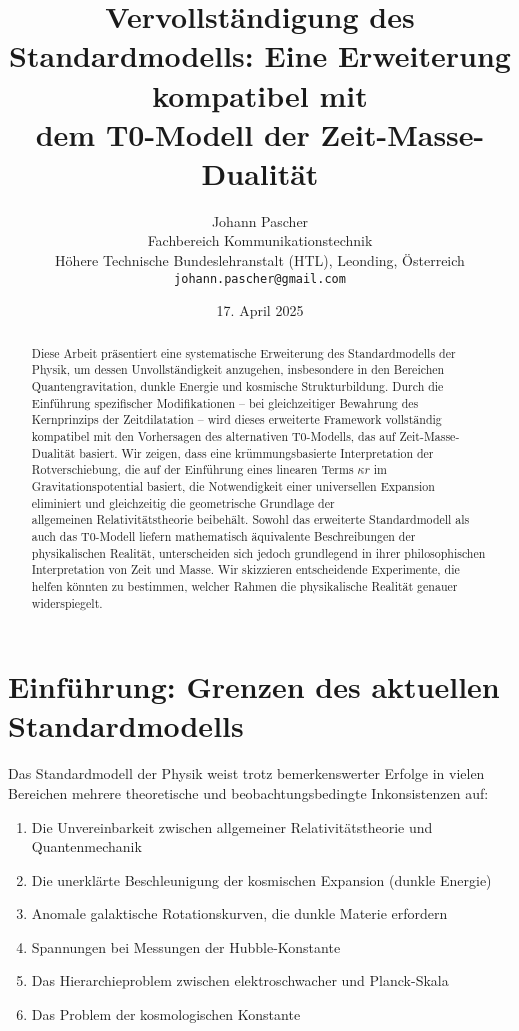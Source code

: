\documentclass[12pt,a4paper]{article}
\title{Vervollständigung des Standardmodells: Eine Erweiterung kompatibel mit\\dem T0-Modell der Zeit-Masse-Dualität}
\author{Johann Pascher\\
	Fachbereich Kommunikationstechnik\\
	Höhere Technische Bundeslehranstalt (HTL), Leonding, Österreich\\
	\texttt{johann.pascher@gmail.com}}
\date{17. April 2025}
\begin{document}
	
	\maketitle
	
	\begin{abstract}
		Diese Arbeit präsentiert eine systematische Erweiterung des Standardmodells der Physik, um dessen Unvollständigkeit anzugehen, insbesondere in den Bereichen Quantengravitation, dunkle Energie und kosmische Strukturbildung. Durch die Einführung spezifischer Modifikationen – bei gleichzeitiger Bewahrung des Kernprinzips der Zeitdilatation – wird dieses erweiterte Framework vollständig kompatibel mit den Vorhersagen des alternativen T0-Modells, das auf Zeit-Masse-Dualität basiert\cite{pascher_zeit_masse_2025}. Wir zeigen, dass eine krümmungsbasierte Interpretation der Rotverschiebung, die auf der Einführung eines linearen Terms $\kappa r$ im Gravitationspotential basiert, die Notwendigkeit einer universellen Expansion eliminiert und gleichzeitig die geometrische Grundlage der \\allgemeinen Relativitätstheorie beibehält. Sowohl das erweiterte Standardmodell als auch das T0-Modell liefern mathematisch äquivalente Beschreibungen der physikalischen Realität, unterscheiden sich jedoch grundlegend in ihrer philosophischen Interpretation von Zeit und Masse. Wir skizzieren entscheidende Experimente, die helfen könnten zu bestimmen, welcher Rahmen die physikalische Realität genauer widerspiegelt.
	\end{abstract}
	
	\tableofcontents
	\newpage
	
	\section{Einführung: Grenzen des aktuellen Standardmodells}
	\label{sec:introduction}
	
	Das Standardmodell der Physik weist trotz bemerkenswerter Erfolge in vielen Bereichen mehrere theoretische und beobachtungsbedingte Inkonsistenzen auf:
	
	\begin{enumerate}
		\item Die Unvereinbarkeit zwischen allgemeiner Relativitätstheorie\cite{einstein1915} und Quantenmechanik\cite{schrodinger1926}
		\item Die unerklärte Beschleunigung der kosmischen Expansion (dunkle Energie)\cite{perlmutter1999}
		\item Anomale galaktische Rotationskurven, die dunkle Materie erfordern\cite{rubin1980}
		\item Spannungen bei Messungen der Hubble-Konstante\cite{riess2019}
		\item Das Hierarchieproblem zwischen elektroschwacher und Planck-Skala\cite{thooft1980}
		\item Das Problem der kosmologischen Konstante\cite{weinberg1989}
	\end{enumerate}
	
\end{document}
